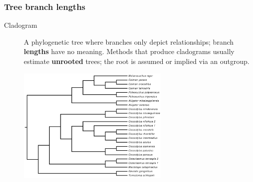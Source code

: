 \begin{frame}
\begin{columns}[c]
\begin{center}
        \end{center}
    \end{columns}
\end{frame}
                
\begin{frame}
    \frametitle{Tree branch lengths}
    \vspace{-0.25cm}
    \begin{description}
        \item[Cladogram] A phylogenetic tree where branches only depict
            relationships; branch \textbf{lengths} have no meaning.  Methods
            that produce cladograms usually estimate \textbf{unrooted} trees; the
            root is assumed or implied via an outgroup.
    \end{description}
    \begin{figure}
        \begin{center}
            \includegraphics[width=0.65\textwidth]{../images/crocodylia-species-tree-cladogram.pdf}
        \end{center}
    \end{figure}
\end{frame}

